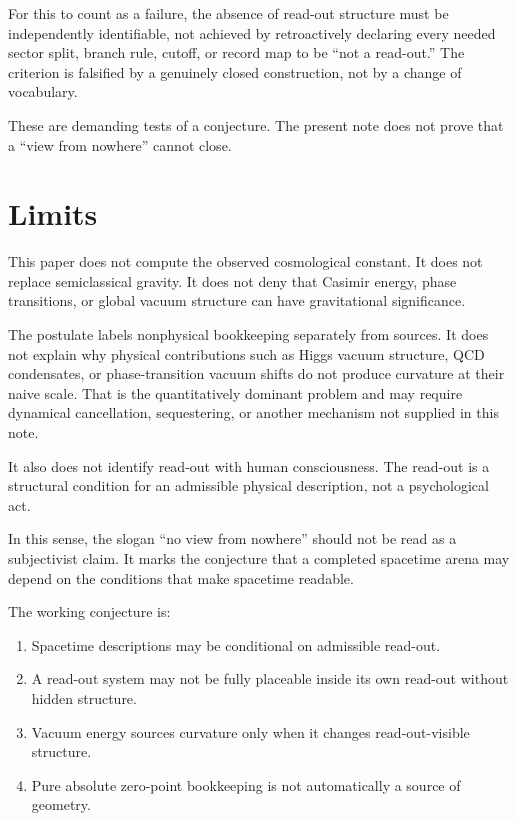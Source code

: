 \documentclass[12pt,a4paper]{article}
\theoremstyle{definition}
\theoremstyle{remark}
\newcommand{\tightlist}{%
  \setlength{\itemsep}{0pt}\setlength{\parskip}{0pt}}
\begin{document}
For this to count as a failure, the absence of read-out structure must be independently identifiable, not achieved by retroactively declaring every needed sector split, branch rule, cutoff, or record map to be ``not a read-out.'' The criterion is falsified by a genuinely closed construction, not by a change of vocabulary.

These are demanding tests of a conjecture.  The present note does not prove that a ``view from nowhere'' cannot close.

\section{Limits}
\label{sec:limits}

This paper does not compute the observed cosmological constant. It does not replace semiclassical gravity. It does not deny that Casimir energy, phase transitions, or global vacuum structure can have gravitational significance.

The postulate labels nonphysical bookkeeping separately from sources. It does not explain why physical contributions such as Higgs vacuum structure, QCD condensates, or phase-transition vacuum shifts do not produce curvature at their naive scale. That is the quantitatively dominant problem and may require dynamical cancellation, sequestering, or another mechanism not supplied in this note.

It also does not identify read-out with human consciousness. The read-out is a structural condition for an admissible physical description, not a psychological act.

In this sense, the slogan ``no view from nowhere'' should not be read as a subjectivist claim. It marks the conjecture that a completed spacetime arena may depend on the conditions that make spacetime readable.

The working conjecture is:

\begin{enumerate}[leftmargin=*]
\tightlist
\item Spacetime descriptions may be conditional on admissible read-out.
\item A read-out system may not be fully placeable inside its own read-out without hidden structure.
\item Vacuum energy sources curvature only when it changes read-out-visible structure.
\item Pure absolute zero-point bookkeeping is not automatically a source of geometry.
\end{enumerate}
\end{document}
